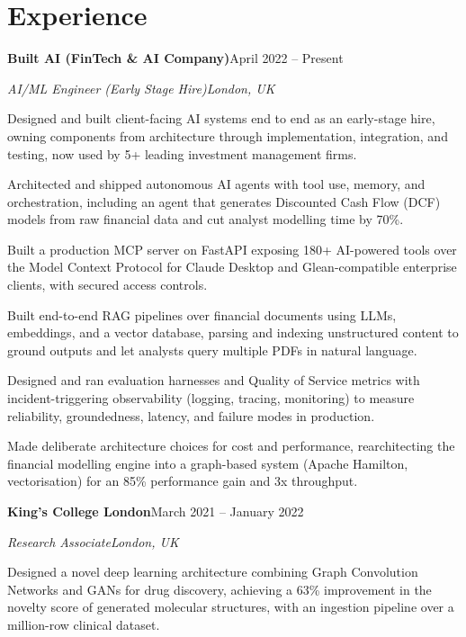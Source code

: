 \documentclass[10pt,a4paper]{article}
\newcommand{\entry}[4]{%
  {\color{company}\bfseries #1}\hfill {\color{muted}#2}\par
  \vspace{1pt}
  {\itshape #3}\hfill {\color{muted}\itshape #4}\par
  \vspace{3pt}%
}
\begin{document}
\section{Experience}
\entry{Built AI (FinTech \& AI Company)}{April 2022 -- Present}{AI/ML Engineer (Early Stage Hire)}{London, UK}
\begin{tight}
  \item Designed and built client-facing AI systems end to end as an early-stage hire, owning components from architecture through implementation, integration, and testing, now used by 5+ leading investment management firms.
  \item Architected and shipped autonomous AI agents with tool use, memory, and orchestration, including an agent that generates Discounted Cash Flow (DCF) models from raw financial data and cut analyst modelling time by 70\%.
  \item Built a production MCP server on FastAPI exposing 180+ AI-powered tools over the Model Context Protocol for Claude Desktop and Glean-compatible enterprise clients, with secured access controls.
  \item Built end-to-end RAG pipelines over financial documents using LLMs, embeddings, and a vector database, parsing and indexing unstructured content to ground outputs and let analysts query multiple PDFs in natural language.
  \item Designed and ran evaluation harnesses and Quality of Service metrics with incident-triggering observability (logging, tracing, monitoring) to measure reliability, groundedness, latency, and failure modes in production.
  \item Made deliberate architecture choices for cost and performance, rearchitecting the financial modelling engine into a graph-based system (Apache Hamilton, vectorisation) for an 85\% performance gain and 3x throughput.
\end{tight}

\entry{King's College London}{March 2021 -- January 2022}{Research Associate}{London, UK}
\begin{tight}
  \item Designed a novel deep learning architecture combining Graph Convolution Networks and GANs for drug discovery, achieving a 63\% improvement in the novelty score of generated molecular structures, with an ingestion pipeline over a million-row clinical dataset.
\end{tight}
\end{document}
